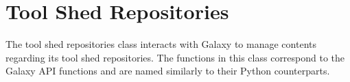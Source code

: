 \hypertarget{group__tool__shed__repositories__class}{}\section{Tool Shed Repositories}
\label{group__tool__shed__repositories__class}
The tool shed repositories class interacts with Galaxy to manage contents regarding its tool shed repositories. The functions in this class correspond to the Galaxy A\+PI functions and are named similarly to their Python counterparts. 